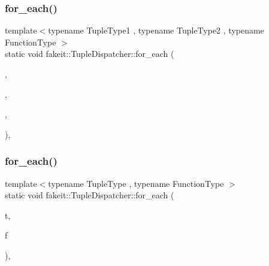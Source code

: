 \mbox{\label{structfakeit_1_1TupleDispatcher_a30fb1a59df83f4faaa461d3fee4b20bc}} 
\subsubsection{\texorpdfstring{for\_each()}{for\_each()}\hspace{0.1cm}{\footnotesize\ttfamily [14/54]}}
{\footnotesize\ttfamily template$<$typename Tuple\+Type1 , typename Tuple\+Type2 , typename Function\+Type $>$ \\
static void fakeit\+::\+Tuple\+Dispatcher\+::for\+\_\+each (\begin{DoxyParamCaption}\item[{Tuple\+Type1 \&\&}]{,  }\item[{Tuple\+Type2 \&\&}]{,  }\item[{Function\+Type \&}]{,  }\item[{std\+::integral\+\_\+constant$<$ size\+\_\+t, std\+::tuple\+\_\+size$<$ typename std\+::remove\+\_\+reference$<$ Tuple\+Type1 $>$\+::type $>$\+::value $>$}]{ }\end{DoxyParamCaption})\hspace{0.3cm}{\ttfamily [inline]}, {\ttfamily [static]}}

\mbox{\label{structfakeit_1_1TupleDispatcher_a8fd292a71795aae0aba215dad28ee4c2}} 
\subsubsection{\texorpdfstring{for\_each()}{for\_each()}\hspace{0.1cm}{\footnotesize\ttfamily [15/54]}}
{\footnotesize\ttfamily template$<$typename Tuple\+Type , typename Function\+Type $>$ \\
static void fakeit\+::\+Tuple\+Dispatcher\+::for\+\_\+each (\begin{DoxyParamCaption}\item[{Tuple\+Type \&\&}]{t,  }\item[{Function\+Type \&}]{f }\end{DoxyParamCaption})\hspace{0.3cm}{\ttfamily [inline]}, {\ttfamily [static]}}

